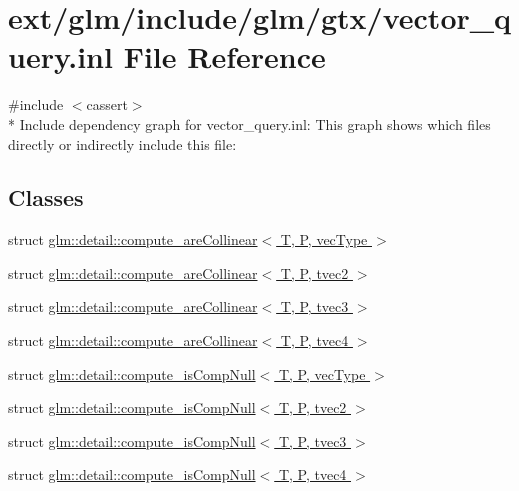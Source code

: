\hypertarget{vector__query_8inl}{\section{ext/glm/include/glm/gtx/vector\-\_\-query.inl File Reference}
\label{vector__query_8inl}
}
{\ttfamily \#include $<$cassert$>$}\\*
Include dependency graph for vector\-\_\-query.\-inl\-:
This graph shows which files directly or indirectly include this file\-:
\subsection*{Classes}
\begin{DoxyCompactItemize}
\item 
struct \hyperlink{structglm_1_1detail_1_1compute__are_collinear}{glm\-::detail\-::compute\-\_\-are\-Collinear$<$ T, P, vec\-Type $>$}
\item 
struct \hyperlink{structglm_1_1detail_1_1compute__are_collinear_3_01_t_00_01_p_00_01tvec2_01_4}{glm\-::detail\-::compute\-\_\-are\-Collinear$<$ T, P, tvec2 $>$}
\item 
struct \hyperlink{structglm_1_1detail_1_1compute__are_collinear_3_01_t_00_01_p_00_01tvec3_01_4}{glm\-::detail\-::compute\-\_\-are\-Collinear$<$ T, P, tvec3 $>$}
\item 
struct \hyperlink{structglm_1_1detail_1_1compute__are_collinear_3_01_t_00_01_p_00_01tvec4_01_4}{glm\-::detail\-::compute\-\_\-are\-Collinear$<$ T, P, tvec4 $>$}
\item 
struct \hyperlink{structglm_1_1detail_1_1compute__is_comp_null}{glm\-::detail\-::compute\-\_\-is\-Comp\-Null$<$ T, P, vec\-Type $>$}
\item 
struct \hyperlink{structglm_1_1detail_1_1compute__is_comp_null_3_01_t_00_01_p_00_01tvec2_01_4}{glm\-::detail\-::compute\-\_\-is\-Comp\-Null$<$ T, P, tvec2 $>$}
\item 
struct \hyperlink{structglm_1_1detail_1_1compute__is_comp_null_3_01_t_00_01_p_00_01tvec3_01_4}{glm\-::detail\-::compute\-\_\-is\-Comp\-Null$<$ T, P, tvec3 $>$}
\item 
struct \hyperlink{structglm_1_1detail_1_1compute__is_comp_null_3_01_t_00_01_p_00_01tvec4_01_4}{glm\-::detail\-::compute\-\_\-is\-Comp\-Null$<$ T, P, tvec4 $>$}
\end{DoxyCompactItemize}
